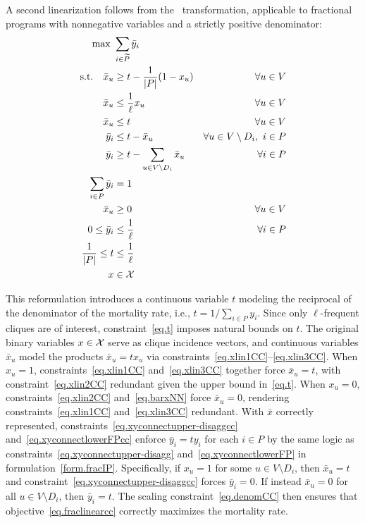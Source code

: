 A second linearization follows from the~\cite{charnes1962}
transformation, applicable to fractional programs with nonnegative
variables and a strictly positive denominator:
\begin{subequations}\label{form.CCIP}
\begin{align}
  \max\ & \sum_{i \in \widetilde{P}} \bar{y}_i
  \label{eq.fraclinearcc} \\
  \text{s.t.}\quad
  \bar{x}_u &\ge t - \frac{1}{|P|}(1 - x_u) & \forall u \in V
  \label{eq.xlin1CC} \\
  \bar{x}_u &\le \frac{1}{\ell} x_u & \forall u \in V
  \label{eq.xlin2CC} \\
  \bar{x}_u &\le t & \forall u \in V \label{eq.xlin3CC} \\
  \bar{y}_i &\le t - \bar{x}_u & \forall u \in V\setminus D_i,\ i
  \in P \label{eq.xyconnectupper-disaggcc} \\
  \bar{y}_i &\ge t - \sum_{u \in V\setminus D_i} \bar{x}_u &
  \forall i \in P \label{eq.xyconnectlowerFPcc} \\
  \sum_{i \in P} \bar{y}_i &= 1 \label{eq.denomCC} \\
  \bar{x}_u &\ge 0 & \forall u \in V \label{eq.barxNN} \\
  0 \le \bar{y}_i &\le \frac{1}{\ell} & \forall i \in P
  \label{eq.bary_bounds} \\
  \frac{1}{|P|} \le t &\le \frac{1}{\ell} \label{eq.t} \\
  x &\in \calX \label{eq.xbincc}
\end{align}
\end{subequations}

This reformulation introduces a continuous variable $t$ modeling the
reciprocal of the denominator of the mortality rate, i.e.,
$t = 1/\sum_{i \in P} y_i$. Since only $\ell$-frequent cliques are
of interest, constraint~\eqref{eq.t} imposes natural bounds on $t$.
The original binary variables $x \in \mathcal{X}$ serve as clique incidence
vectors, and continuous variables $\bar{x}_u$ model the products
$\bar{x}_u = t x_u$ via
constraints~\eqref{eq.xlin1CC}--\eqref{eq.xlin3CC}. When $x_u = 1$,
constraints~\eqref{eq.xlin1CC} and~\eqref{eq.xlin3CC} together force
$\bar{x}_u = t$, with constraint~\eqref{eq.xlin2CC} redundant given
the upper bound in~\eqref{eq.t}. When $x_u = 0$,
constraints~\eqref{eq.xlin2CC} and~\eqref{eq.barxNN} force
$\bar{x}_u = 0$, rendering constraints~\eqref{eq.xlin1CC}
and~\eqref{eq.xlin3CC} redundant. With $\bar{x}$ correctly
represented, constraints~\eqref{eq.xyconnectupper-disaggcc}
and~\eqref{eq.xyconnectlowerFPcc} enforce $\bar{y}_i = t y_i$ for
each $i \in P$ by the same logic as
constraints~\eqref{eq.xyconnectupper-disagg}
and~\eqref{eq.xyconnectlowerFP} in
formulation~\eqref{form.fracIP}. Specifically, if $x_u = 1$ for some
$u \in V \setminus D_i$, then $\bar{x}_u = t$ and
constraint~\eqref{eq.xyconnectupper-disaggcc} forces $\bar{y}_i = 0$.
If instead $\bar{x}_u = 0$ for all $u \in V \setminus D_i$, then
$\bar{y}_i = t$. The scaling constraint~\eqref{eq.denomCC} then
ensures that objective~\eqref{eq.fraclinearcc} correctly maximizes
the mortality rate.

